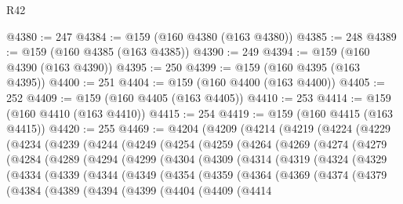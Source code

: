 \begin{lexlean}{R42}
\begin{coremodule}
@4380 := 247
@4384 := @159 (@160 @4380 (@163 @4380))
@4385 := 248
@4389 := @159 (@160 @4385 (@163 @4385))
@4390 := 249
@4394 := @159 (@160 @4390 (@163 @4390))
@4395 := 250
@4399 := @159 (@160 @4395 (@163 @4395))
@4400 := 251
@4404 := @159 (@160 @4400 (@163 @4400))
@4405 := 252
@4409 := @159 (@160 @4405 (@163 @4405))
@4410 := 253
@4414 := @159 (@160 @4410 (@163 @4410))
@4415 := 254
@4419 := @159 (@160 @4415 (@163 @4415))
@4420 := 255
@4469 := @4204
    (@4209
      (@4214
        (@4219
          (@4224
            (@4229
              (@4234
                (@4239
                  (@4244
                    (@4249
                      (@4254
                        (@4259
                          (@4264
                            (@4269
                              (@4274
                                (@4279
                                  (@4284
                                    (@4289
                                      (@4294
                                        (@4299
                                          (@4304
                                            (@4309
                                              (@4314
                                                (@4319
                                                  (@4324
                                                    (@4329
                                                      (@4334
                                                        (@4339
                                                          (@4344
                                                            (@4349
                                                              (@4354
                                                                (@4359
                                                                  (@4364
                                                                    (@4369
                                                                      (@4374
                                                                        (@4379
                                                                          (@4384
                                                                            (@4389
                                                                              (@4394
                                                                                (@4399
                                                                                  (@4404
                                                                                    (@4409
                                                                                      (@4414

\end{coremodule}
\end{lexlean}
